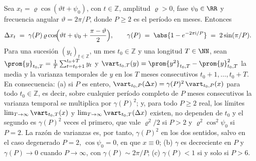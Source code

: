 \begin{proposicion}\label{prop:ganancia}
Sea $x_t=\varrho\cos(\vartheta t+\psi_0)$, con $t\in\mathbb{Z}$, amplitud $\varrho>0$, fase
$\psi_0\in\RR$ y frecuencia angular $\vartheta=2\pi/P$, donde $P\ge 2$ es el período en meses.
Entonces
\begin{equation}\label{eq:ganancia}
  \Delta x_t \;=\; \gamma(P)\,\varrho\cos\!\Bigl(\vartheta t+\psi_0+\frac{\pi-\vartheta}{2}\Bigr),
  \qquad
  \gamma(P)\;=\;\abs{1-e^{-2\pi\mathrm{i}/P}}\;=\;2\sin(\pi/P).
\end{equation}
Para una sucesión $(y_t)_{t\in\mathbb{Z}}$, un mes $t_0\in\mathbb{Z}$ y una longitud
$T\in\NN$, sean $\prom{y}_{t_0,T}=\frac1T\sum_{t=t_0+1}^{t_0+T}y_t$ y
$\vart_{t_0,T}(y)=\prom{y^2}_{t_0,T}-\prom{y}_{t_0,T}^2$ la media y la varianza temporales de
$y$ en los $T$ meses consecutivos $t_0+1,\dots,t_0+T$. En consecuencia:
\textup{(a)} si $P$ es entero, $\vart_{t_0,P}(\Delta x)=\gamma(P)^2\,\vart_{t_0,P}(x)$ para todo
$t_0\in\mathbb{Z}$, es decir, sobre cualquier período completo de $P$ meses consecutivos la
varianza temporal se multiplica por $\gamma(P)^2$; y, para todo $P\ge2$ real, los límites
$\lim_{T\to\infty}\vart_{t_0,T}(x)$ y $\lim_{T\to\infty}\vart_{t_0,T}(\Delta x)$ existen, no
dependen de $t_0$ y el segundo es $\gamma(P)^2$ veces el primero, que vale $\varrho^2/2$ si $P>2$
y $\varrho^2\cos^2\psi_0$ si $P=2$. La razón de varianzas es, por tanto, $\gamma(P)^2$ en los dos
sentidos, salvo en el caso degenerado $P=2$, $\cos\psi_0=0$, en que $x\equiv0$; \textup{(b)} $\gamma$ es decreciente en $P$ y
$\gamma(P)\to 0$ cuando $P\to\infty$, con $\gamma(P)\sim 2\pi/P$; \textup{(c)} $\gamma(P)<1$
si y solo si $P>6$.
\end{proposicion}

